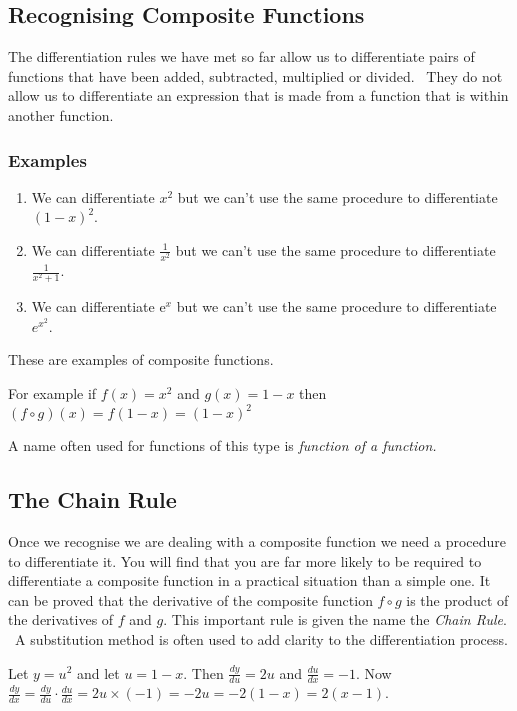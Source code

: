 \subsection{Recognising Composite Functions}
The differentiation rules we have met so far allow us to differentiate pairs of functions that have been added, subtracted, multiplied or divided.
\ They do not allow us to differentiate an expression that is made from a function that is within another function.


\subsubsection{Examples}
\begin{enumerate}
\item We can differentiate $x^{2}$ but we can't use the same procedure to differentiate $\left (1 -x\right )^{2}$. 

\item We can differentiate $\frac{1}{x^{2}}$ but we can't use the same procedure to differentiate $\frac{1}{x^{2} +1}$. 

\item We can differentiate e$^{x}$ but we can't use the same procedure to differentiate $e^{x^{2}}$. \end{enumerate}


These are examples of composite functions. 

For
example if $f (x) =x^{2}$ and $g (x) =1 -x$ then $\left (f \circ g\right ) (x) =f (1 -x) =\left (1 -x\right )^{2}$ 

A name often used for functions of this type is \emph{function of a function.} 

\subsection{The Chain Rule}
Once we recognise we are dealing with a composite function we need a procedure to differentiate it. You
will find that you are far more likely to be required to differentiate a composite function in a practical situation than a simple one. It
can be proved that the derivative of the composite function $f \circ g$ is the product of the derivatives of $f$ and $g$. This important rule is given the name the \emph{Chain Rule}.
\ A substitution method is often used to add clarity to the differentiation process. 

Let
$y =u^{2}$ and let $u =1 -x$. Then $\frac{d y}{d u} =2 u$ and $\frac{d u}{d x} = -1$. Now $\frac{d y}{d x} =\frac{d y}{d u} \cdot \frac{d u}{d x} =2 u \times ( -1) = -2 u = -2 (1 -x) =2 (x -1)$. 

